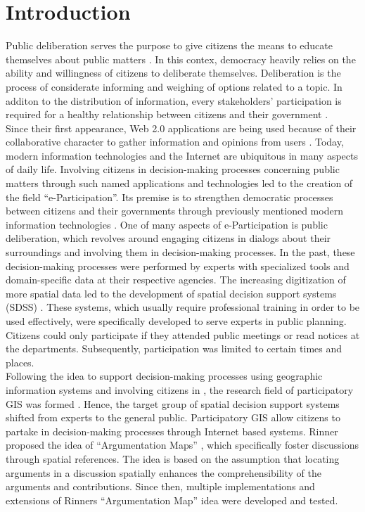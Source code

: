 \section{Introduction}
\label{chap:introduction}
Public deliberation serves the purpose to give citizens the means to educate themselves about public matters \cite{page1996deliberates}. In this contex, democracy heavily relies on the ability and willingness of citizens to deliberate themselves. Deliberation is the process of considerate informing and weighing of options related to a topic. In additon to the distribution of information, every stakeholders' participation is required for a healthy relationship between citizens and their government \cite{Arnstein1969_citizen_participation}.\\
Since their first appearance, Web 2.0 applications are being used because of their collaborative character to gather information and opinions from users \cite{o2007web}. Today, modern information technologies and the Internet are ubiquitous in many aspects of daily life. Involving citizens in decision-making processes concerning public matters through such named applications and technologies led to the creation of the field ``e-Participation''. Its premise is to strengthen democratic processes between citizens and their governments through previously mentioned modern information technologies \cite{Saebo_eParticipation, Medaglia2012_eParticipation}. One of many aspects of e-Participation is public deliberation, which revolves around engaging citizens in dialogs about their surroundings and involving them in decision-making processes. In the past, these decision-making processes were performed by experts with specialized tools and domain-specific data at their respective agencies. The increasing digitization of more spatial data led to the development of spatial decision support systems (SDSS) \cite{densham_sdss}. These systems, which usually require professional training in order to be used effectively, were specifically developed to serve experts in public planning. Citizens could only participate if they attended public meetings or read notices at the departments. Subsequently, participation was limited to certain times and places.\\
Following the idea to support decision-making processes using geographic information systems and involving citizens in , the research field of participatory GIS was formed \cite{Macintosh2004_eParticipation_characterization,Sieber2006_PublicParticipationGIS}. Hence, the target group of spatial decision support systems shifted from experts to the general public. Participatory GIS allow citizens to partake in decision-making processes through Internet based systems. Rinner proposed the idea of ``Argumentation Maps'' \cite{Rinner_ArgumentationMaps}, which specifically foster discussions through spatial references. The idea is based on the assumption that locating arguments in a discussion spatially enhances the comprehensibility of the arguments and contributions. Since then, multiple implementations and extensions of Rinners ``Argumentation Map'' idea were developed and tested.\\
